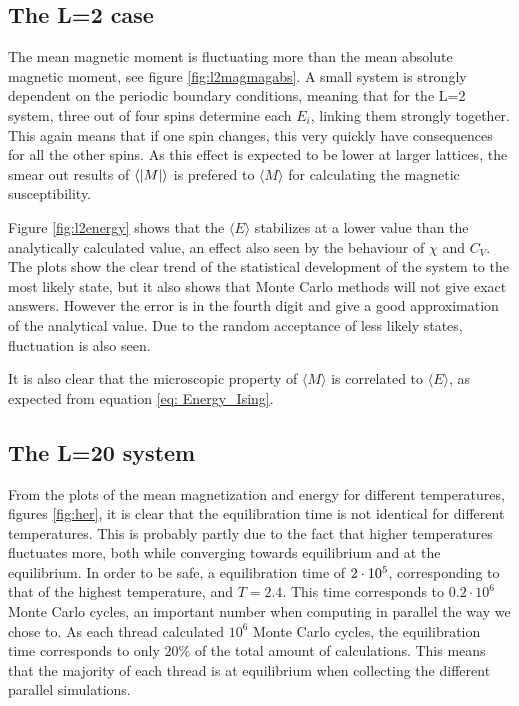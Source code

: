 



\subsection{The L=2 case}

The mean magnetic moment is fluctuating more than the mean absolute magnetic moment, see figure \ref{fig:l2magmagabs}. A small system  is strongly dependent on the periodic boundary conditions, meaning that for the L=2 system, three out of four spins determine each $ E_i $, linking them strongly together. This again means that if one spin changes, this very quickly have consequences for all the other spins. As this effect is expected to be lower at larger lattices, the smear out results of $ \langle \abs{M}\rangle$ is prefered to $ \langle {M}\rangle$ for calculating the magnetic susceptibility. 

Figure \ref{fig:l2energy} shows that the $ \langle E \rangle $ stabilizes at a lower value than the analytically calculated value, an effect also seen by the behaviour of $ \chi  $ and $ C_V $. The plots show the clear trend of the statistical development of the system to the most likely state, but it also shows that  Monte Carlo methods will not give exact answers. However the error is in the fourth digit and give a good approximation of the analytical value. Due to the random acceptance of less likely states, fluctuation is also seen.

It is also clear that the microscopic property of $ \langle M \rangle  $ is correlated to $\langle E \rangle  $, as expected from equation \ref{eq: Energy_Ising}.

\subsection{The L=20 system}

From the plots of the mean magnetization and energy for different temperatures, figures \ref{fig:her}, it is clear that the equilibration time is not identical for different temperatures. This  is probably partly due to the fact that higher temperatures fluctuates more, both while converging towards equilibrium and at the equilibrium. In order to be safe, a equilibration time of $ 2\cdot 10^{5} $, corresponding to that of the highest temperature, and $ T = 2.4 $. This time corresponds to $ 0.2\cdot 10^6 $ Monte Carlo cycles, an important number when computing in parallel the way we chose to. As each thread calculated $ 10^6 $  Monte Carlo cycles, the equilibration time corresponds to only $ 20\% $ of the total amount of calculations. This means that the majority of each thread is at equilibrium when collecting the different parallel simulations.


